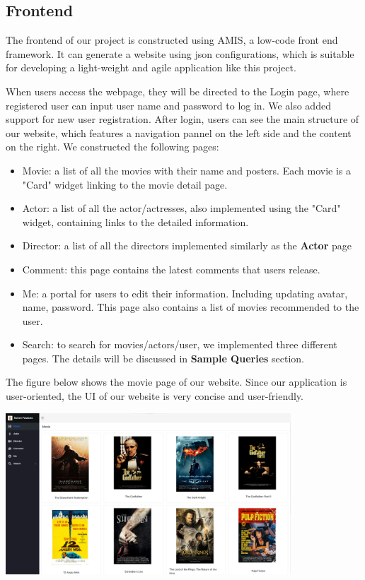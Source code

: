 \begin{CJK*}{UTF8}{gbsn}
\subsection{Frontend}
The frontend of our project is constructed using AMIS, a low-code front end framework. It can generate a website using json configurations, which is suitable for developing a light-weight and agile application like this project.\par
When users access the webpage, they will be directed to the Login page, where registered user can input user name and password to log in. We also added support for new user registration.
After login, users can see the  main structure of our website, which features a navigation pannel on the left side and the content on the right. We constructed the following pages:
\begin{itemize}
    \item Movie: a list of all the movies with their name and posters. Each movie is a "Card" widget linking to the movie detail page.
    \item Actor: a list of all the actor/actresses, also implemented using the "Card" widget, containing links to the detailed information.
    \item Director: a list of all the directors implemented similarly as the \textbf{Actor} page
    \item Comment: this page contains the latest comments that users release.
    \item Me: a portal for users to edit their information. Including updating avatar, name, password. This page also contains a list of movies recommended to the user.
    \item Search: to search for movies/actors/user, we implemented three different pages. The details will be discussed in \textbf{Sample Queries} section.
\end{itemize}
\par The figure below shows the movie page of our website. Since our application is user-oriented, the UI of our website is very concise and user-friendly.\par
\includegraphics[width=0.8\textwidth]{website.png}

\end{CJK*}
